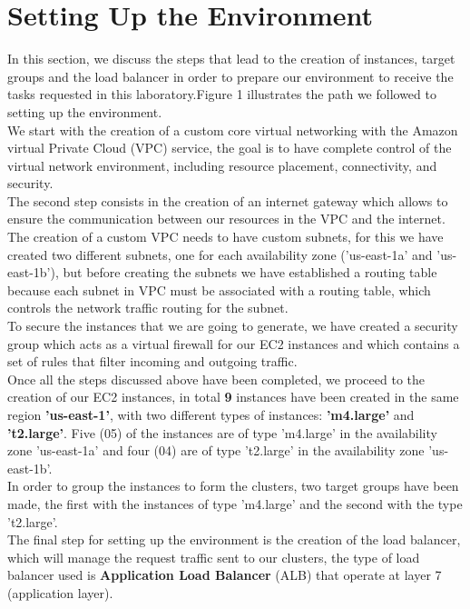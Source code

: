 \documentclass[12pt]{article}
\begin{document}
\section{Setting Up the Environment}
In this section, we discuss the steps that lead to the creation of instances, target groups and the load balancer in order to prepare our environment to receive the tasks requested in this laboratory.Figure 1 illustrates the path we followed to setting up the environment.\\
We start with the creation of a custom core virtual networking with the Amazon virtual Private Cloud (VPC) service, the goal is to have complete control of the virtual network environment, including resource placement, connectivity, and security.\\
The second step consists in the creation of an internet gateway which allows to ensure the communication between our resources in the VPC and the internet.\\
The creation of a custom VPC needs to have custom subnets, for this we have created two different subnets, one for each availability zone ('us-east-1a' and 'us-east-1b'), but before creating the subnets we have established a routing table because each subnet in VPC must be associated with a routing table, which controls the network traffic routing for the subnet.\\
To secure the instances that we are going to generate, we have created a security group which acts as a virtual firewall for our EC2 instances and which contains a set of rules that filter incoming and outgoing traffic.\\
Once all the steps discussed above have been completed, we proceed to the creation of our EC2 instances, in total \textbf{9} instances have been created in the same region \textbf{'us-east-1'}, with two different types of instances: \textbf{'m4.large'} and \textbf{'t2.large'}. Five (05) of the instances are of type 'm4.large' in the availability zone 'us-east-1a' and four (04) are of type 't2.large' in the availability zone 'us-east-1b'.\\
In order to group the instances to form the clusters, two target groups have been made, the first with the instances of type 'm4.large' and the second with the type 't2.large'.\\
The final step for setting up the environment is the creation of the load balancer, which will manage the request traffic sent to our clusters, the type of load balancer used is \textbf{Application Load Balancer} (ALB) that operate at layer 7 (application layer).
\end{document}
